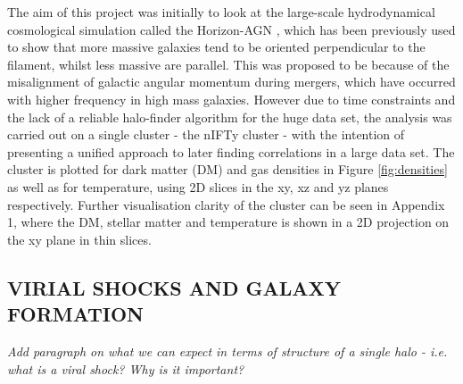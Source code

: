 \documentclass[journal]{IEEEtran}
\begin{document}
The aim of this project was initially to look at the large-scale hydrodynamical cosmological simulation called the Horizon-AGN \cite{dubois14}, which has been previously used to show that more massive galaxies tend to be oriented perpendicular to the filament, whilst less massive are parallel. This was proposed to be because of the misalignment of galactic angular momentum during mergers, which have occurred with higher frequency in high mass galaxies. However due to time constraints and the lack of a reliable halo-finder algorithm for the huge data set, the analysis was carried out on a single cluster - the nIFTy cluster \cite{nifty}- with the intention of presenting a unified approach to later finding correlations in a large data set. The cluster is plotted for dark matter (DM) and gas densities in Figure \ref{fig:densities} as well as for temperature, using 2D slices in the xy, xz and yz planes respectively. Further visualisation clarity of the cluster can be seen in Appendix 1, where the DM, stellar matter and temperature is shown in a 2D projection on the xy plane in thin slices. 

\subsection*{VIRIAL SHOCKS AND GALAXY FORMATION}

\textit{Add paragraph on what we can expect in terms of structure of a single halo - i.e. what is a viral shock? Why is it important?}
\end{document}
